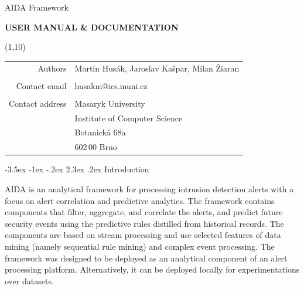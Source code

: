 \documentclass[a4paper]{article} %
\makeatletter
\def\muni{Masaryk University}
\def\uvt{Institute of Computer Science}
\def\street{Botanick\'{a} 68a}
\def\psc{602\,00 Brno}
\def\contactemail{husakm@ics.muni.cz}
\def\projectname{AIDA Framework}
\def\reportauthor{Martin Hus\'{a}k, Jaroslav Ka\v{s}par, Milan \v{Z}iaran}
\def\reporttitle{User Manual \& Documentation}
\renewcommand\section{\@startsection {section}{1}{\z@}%
                   {-3.5ex \@plus -1ex \@minus -.2ex}%
                   {2.3ex \@plus.2ex}%
                   {\normalfont\sffamily\Large\bfseries\color{projectcolor}}}
\newcommand\BackImage[2][scale=1]{%
\BgThispage
\backgroundsetup{
  contents={\texttt{[image: \#2]}}
  }
}
\makeatother
\begin{document}
\setlength{\parindent}{0cm}

{
\BackImage[width=1.4\textwidth]{fig/titlepage_bg}

\vspace*{5cm}

\color{white}
  \begin{center}
  \vspace{2cm} {\Huge \projectname}

  \vspace{1cm} {\huge\bfseries\MakeUppercase{\reporttitle}}
  \end{center}

  \begin{textblock}{3}(1,10)
         \begin{tabular}{rl }
            Authors & \reportauthor \\
             & \\
            Contact email & \contactemail \\
             & \\
            Contact address & \muni \\
             & \uvt \\
             & \street \\
             & \psc \\
          \end{tabular}
  \end{textblock}
  \cleardoublepage
}

\normalfont



\setcounter{tocdepth}{2}

\tableofcontents

\cleardoublepage

\section{Introduction}

AIDA is an analytical framework for processing intrusion detection alerts with a focus on alert correlation and predictive analytics. The framework contains components that filter, aggregate, and correlate the alerts, and predict future security events using the predictive rules distilled from historical records. The components are based on stream processing and use selected features of data mining (namely sequential rule mining) and complex event processing. The framework was designed to be deployed as an analytical component of an alert processing platform. Alternatively, it can be deployed locally for experimentations over datasets.
\end{document}
